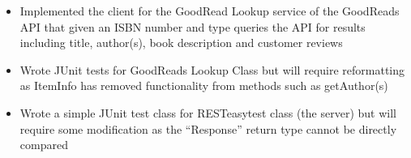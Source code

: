 \documentclass[12pt,a4paper]{report}
\begin{document}
\begin{itemize}

\item Implemented the client for the GoodRead Lookup service of the GoodReads API that given an ISBN number and type queries the API for results including title, author(s), book description and customer reviews

\item Wrote JUnit tests for GoodReads Lookup Class but will require reformatting as ItemInfo has removed functionality from methods such as getAuthor(s)

\item Wrote a simple JUnit test class for RESTeasytest class (the server) but will require some modification as the “Response” return type cannot be directly compared

\end{itemize}
\end{document}
